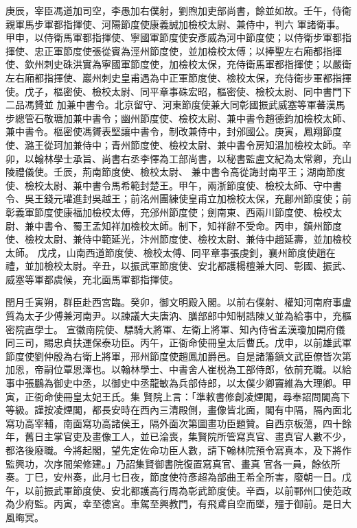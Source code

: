 \begin{pinyinscope}
 庚辰，宰臣馮道加司空，李愚加右僕射，劉煦加吏部尚書，餘並如故。壬午，侍衛親軍馬步軍都指揮使、河陽節度使康義誠加檢校太尉、兼侍中，判六
 軍諸衛事。甲申，以侍衛馬軍都指揮使、寧國軍節度使安彥威為河中節度使；以侍衛步軍都指揮使、忠正軍節度使張從賓為涇州節度使，並加檢校太傅；以捧聖左右廂都指揮使、欽州刺史硃洪實為寧國軍節度使，加檢校太保，充侍衛馬軍都指揮使；以嚴衛左右廂都指揮使、巖州刺史皇甫遇為中正軍節度使、檢校太保，充侍衛步軍都指揮使。戊子，樞密使、檢校太尉、同平章事硃宏昭，樞密使、檢校太尉、同中書門下二品馮贇並
 加兼中書令。北京留守、河東節度使兼大同彰國振武威塞等軍蕃漢馬步總管石敬瑭加兼中書令；幽州節度使、檢校太尉、兼中書令趙德鈞加檢校太師、兼中書令。樞密使馮贇表堅讓中書令，制改兼侍中，封邠國公。庚寅，鳳翔節度使、潞王從珂加兼侍中；青州節度使、檢校太尉、兼中書令房知溫加檢校太師。辛卯，以翰林學士承旨、尚書右丞李懌為工部尚書，以秘書監盧文紀為太常卿，充山陵禮儀使。壬辰，荊南節度使、檢校太尉、
 兼中書令高從誨封南平王；湖南節度使、檢校太尉、兼中書令馬希範封楚王。甲午，兩浙節度使、檢校太師、守中書令、吳王錢元瓘進封吳越王；前洺州團練使皇甫立加檢校太保，充鄜州節度使；前彰義軍節度使康福加檢校太傅，充邠州節度使；劍南東、西兩川節度使、檢校太尉、兼中書令、蜀王孟知祥加檢校太師。制下，知祥辭不受命。丙申，鎮州節度使、檢校太尉、兼侍中範延光，汴州節度使、檢校太尉、兼侍中趙延壽，並加檢校太師。
 戊戌，山南西道節度使、檢校太傅、同平章事張虔釗，襄州節度使趙在禮，並加檢校太尉。辛丑，以振武軍節度使、安北都護楊檀兼大同、彰國、振武、威塞等軍都虞候，充北面馬軍都指揮使。


閏月壬寅朔，群臣赴西宮臨。癸卯，御文明殿入閣。以前右僕射、權知河南府事盧質為太子少傅兼河南尹。以諫議大夫唐汭、膳部郎中知制誥陳乂並為給事中，充樞密院直學士。
 宣徽南院使、驃騎大將軍、左衛上將軍、知內侍省孟漢瓊加開府儀同三司，賜忠貞扶運保泰功臣。丙午，正衙命使冊皇太后曹氏。戊申，以前雄武軍節度使劉仲殷為右衛上將軍，邢州節度使趙鳳加爵邑。自是諸籓鎮文武臣僚皆次第加恩，帝嗣位覃恩澤也。以翰林學士、中書舍人崔棁為工部侍郎，依前充職。以給事中張鵬為御史中丞，以御史中丞龍敏為兵部侍郎，以太僕少卿竇維為大理卿。甲寅，正衙命使冊皇太妃王氏。集
 賢院上言：「準敕書修創凌煙閣，尋奉詔問閣高下等級。謹按凌煙閣，都長安時在西內三清殿側，畫像皆北面，閣有中隔，隔內面北寫功高宰輔，南面寫功高諸侯王，隔外面次第圖畫功臣題贊。自西京板蕩，四十餘年，舊日主掌官吏及畫像工人，並已淪喪，集賢院所管寫真官、畫真官人數不少，都洛後廢職。今將起閣，望先定佐命功臣人數，請下翰林院預令寫真本，及下將作監興功，次序間架修建。」乃詔集賢御書院復置寫真官、畫真
 官各一員，餘依所奏。丁巳，安州奏，此月七日夜，節度使符彥超為部曲王希全所害，廢朝一日。戊午，以前振武軍節度使、安北都護高行周為彰武節度使。辛酉，以前鄆州囗使范政為少府監。丙寅，幸至德宮。車駕至興教門，有飛鳶自空而墜，殭于御前。是日大風晦冥。




\end{pinyinscope}
